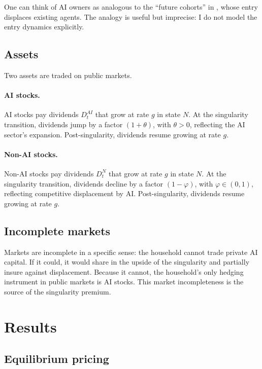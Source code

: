 \documentclass[12pt]{article}
\begin{document}
One can think of AI owners as analogous to the ``future cohorts'' in \citet{GKP2012}, whose entry displaces existing agents. The analogy is useful but imprecise: I do not model the entry dynamics explicitly.

\subsection{Assets}

Two assets are traded on public markets.

\paragraph{AI stocks.} AI stocks pay dividends $D_t^{AI}$ that grow at rate $g$ in state $N$. At the singularity transition, dividends jump by a factor $(1+\theta)$, with $\theta > 0$, reflecting the AI sector's expansion. Post-singularity, dividends resume growing at rate $g$.

\paragraph{Non-AI stocks.} Non-AI stocks pay dividends $D_t^{N}$ that grow at rate $g$ in state $N$. At the singularity transition, dividends decline by a factor $(1-\varphi)$, with $\varphi \in (0,1)$, reflecting competitive displacement by AI. Post-singularity, dividends resume growing at rate $g$.

\subsection{Incomplete markets}

Markets are incomplete in a specific sense: the household cannot trade private AI capital. If it could, it would share in the upside of the singularity and partially insure against displacement. Because it cannot, the household's only hedging instrument in public markets is AI stocks. This market incompleteness is the source of the singularity premium.


\section{Results} %

\subsection{Equilibrium pricing}
\end{document}

